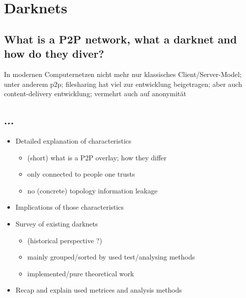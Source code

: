 \chapter{Darknets}

\section{What is a P2P network, what a darknet and how do they diver?}
In modernen Computernetzen nicht mehr nur klassisches Client/Server-Model; unter anderem p2p; filesharing hat viel zur entwicklung beigetragen; aber auch content-delivery entwicklung; vermehrt auch auf anonymität


\section{...}
\begin{itemize}
\item    Detailed explanation of characteristics
\begin{itemize}
\item        (short) what is a P2P overlay; how they differ
\item        only connected to people one trusts
\item        no (concrete) topology information leakage
\end{itemize}
\item    Implications of those characteristics
\item    Survey of existing darknets
\begin{itemize}
\item        (historical perspective ?)
\item        mainly grouped/sorted by used test/analysing methods
\item        implemented/pure theoretical work
\end{itemize}
\item    Recap and explain used metrices and analysis methods
\end{itemize}
